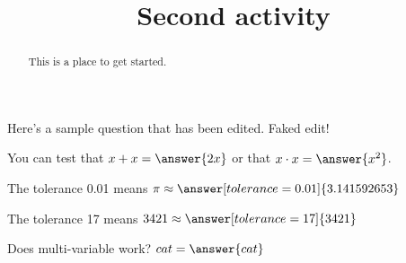 \documentclass[handout]{ximera}
\title{Second activity}
\begin{document}
\begin{abstract}
This is a place to get started.
\end{abstract}


\maketitle

Here's a sample question that has been edited. Faked edit!

\begin{problem}
\begin{multipleChoice}
\end{multipleChoice}
\end{problem}

\begin{problem}
   You can test that $x + x = \answer{2x}$ or that $x \cdot x = \answer{x^2}$.
\end{problem}

\begin{problem}
   The tolerance 0.01 means $\pi \approx \answer[tolerance=0.01]{3.141592653}$
\end{problem}

\begin{problem}
   The tolerance 17 means $3421 \approx \answer[tolerance=17]{3421}$
\end{problem}

\begin{problem}
Does multi-variable work? $ cat = \answer{cat}$
\end{problem}
\end{document}
